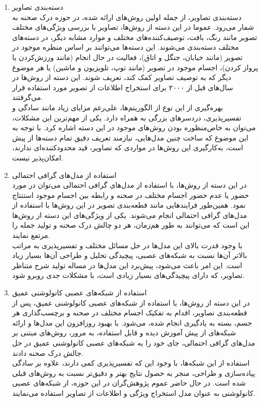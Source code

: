 \begin{itemize}
\begin{enumerate}
	\item دسته‌بندی تصاویر \\
	دسته‌بندی تصاویر، از جمله اولین روش‌های ارائه شده، در حوزه درک صحنه به شمار می‌رود. عموما در این دسته از روش‌ها، تصاویر با بررسی ویژگی‌های مختلف تصویر مانند رنگ، بافت، توصیف‌کننده‌های مختلف و موارد مشابه دیگر، در دسته‌های مختلف دسته‌بندی می‌شوند. این دسته‌‌ها می‌توانند بر اساس منظره موجود در تصویر (مانند خیابان، جنگل و اتاق)، فعالیت در حال انجام (مانند ورزش‌کردن یا پرواز کردن)، اجسام موجود در تصویر (مانند توپ، تلویزیون و ماشین) یا هر موضوع دیگر که به توصیف تصاویر کمک کند، تعریف شوند. این دسته از روش‌ها در سال‌های قبل از ۲۰۰۰ برای استخراج اطلاعات از تصویر مورد استفاده قرار می‌گرفتند.
	\\
بهره‌گیری از این نوع از الگوریتم‌ها، علی‌رغم مزایای زیاد مانند سادگی و تفسیر‌پذیری، دردسرهای بزرگی به همراه دارد. یکی از مهم‌ترین این مشکلات، می‌توان به خاص‌منظوره بودن روش‌های موجود در این دسته اشاره کرد. با توجه به این موضوع که ساخت چنین مدل‌هایی، نیازمند تعریف دقیق تمام دسته‌ها از پیش است، به‌کارگیری این روش‌ها در مواردی که تصاویر، قید محدود‌کننده‌ای ندارند، امکان‌پذیر نیست.
\\
	\item استفاده از مدل‌های گرافی احتمالی \\
	در این دسته از روش‌ها، با استفاده از مدل‌های گرافی احتمالی  می‌توان در مورد حضور یا عدم حضور اجسام مختلف در صحنه و رابطه بین اجسام موجود استنتاج نمود. همین‌طور فرایند‌هایی مانند قطعه‌بندی تصویر
	در این روش‌ها با استفاده از مدل‌های گرافی احتمالی انجام می‌شوند. یکی از ویژگی‌های این دسته از روش‌ها این است که می‌توانند به طور هم‌زمان، هر دو چالش درک صحنه و تولید جمله را مرتفع نمایند. 
	\\
	با وجود قدرت بالای این‌ مدل‌ها در حل مسائل مختلف و تفسیر‌پذیری به مراتب‌ بالاتر آن‌ها نسبت به شبکه‌های عصبی، پیچیدگی تحلیل و طراحی آن‌ها بسیار زیاد است. این امر باعث می‌شود، پیش‌برد این مدل‌ها در مساله تولید شرح متناظر تصاویر، که دارای پیچیدگی‌های بسیار زیادی است، با مشکلات جدی روبرو شود. 
	
	\item استفاده از شبکه‌های عصبی کانولوشنی عمیق\\
	در این دسته از روش‌ها، با استفاده از شبکه‌های عصبی کانولوشنی عمیق، پس از قطعه‌بندی تصاویر، اقدام به تفکیک اجسام مختلف در صحنه و برچسب‌گذاری هر جسم، بسته به یادگیری انجام شده، می‌شود. با بهبود روزافزون این مدل‌ها و ارائه شبکه‌های از پیش آموزش دیده و قابل استفاده، به مرور، روش‌های مبتنی بر مدل‌های گرافی احتمالی، جای خود را به شبکه‌های عصبی کانولوشنی عمیق در حل جالش درک صحنه داد‌ند. 
	\\
	استفاده از این شبکه‌ها، با وجود این که تفسیرپذیری کمی دارند، علاوه بر سادگی پیاده‌سازی و طراحی، منجر به حصول نتایج بهتر و دقیق‌تر نسبت به روش‌های قبلی شده است. در حال حاضر عموم پژوهش‌گران در این حوزه، از شبکه‌های عصبی کانولوشنی به عنوان مدل استخراج ویژگی و اطلاعات از تصاویر استفاده می‌نمایند.


\end{enumerate}
\end{itemize}
